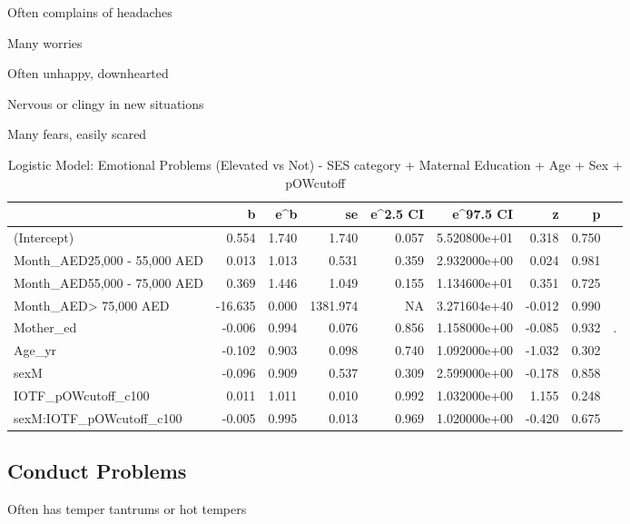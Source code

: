 \documentclass[
]{article}
\begin{document}
Often complains of headaches

Many worries

Often unhappy, downhearted

Nervous or clingy in new situations

Many fears, easily scared

\FloatBarrier

\begin{table}[!h]

\caption{\label{tab:IOTF_pOWcutoff_emotprobs_elevated_logit}Logistic Model: Emotional Problems (Elevated vs Not) - SES category + Maternal Education + Age + Sex + pOWcutoff}
\centering
\begin{tabular}[t]{lrrrrrrrl}
\toprule
  & b & e\textasciicircum{}b & se & e\textasciicircum{}2.5 CI & e\textasciicircum{}97.5 CI & z & p &  \\
\midrule
(Intercept) & 0.554 & 1.740 & 1.740 & 0.057 & 5.520800e+01 & 0.318 & 0.750 & \\
Month\_AED25,000 - 55,000 AED & 0.013 & 1.013 & 0.531 & 0.359 & 2.932000e+00 & 0.024 & 0.981 & \\
Month\_AED55,000 - 75,000 AED & 0.369 & 1.446 & 1.049 & 0.155 & 1.134600e+01 & 0.351 & 0.725 & \\
Month\_AED> 75,000 AED & -16.635 & 0.000 & 1381.974 & NA & 3.271604e+40 & -0.012 & 0.990 & \\
Mother\_ed & -0.006 & 0.994 & 0.076 & 0.856 & 1.158000e+00 & -0.085 & 0.932 & .\\
\addlinespace
Age\_yr & -0.102 & 0.903 & 0.098 & 0.740 & 1.092000e+00 & -1.032 & 0.302 & \\
sexM & -0.096 & 0.909 & 0.537 & 0.309 & 2.599000e+00 & -0.178 & 0.858 & \\
IOTF\_pOWcutoff\_c100 & 0.011 & 1.011 & 0.010 & 0.992 & 1.032000e+00 & 1.155 & 0.248 & \\
sexM:IOTF\_pOWcutoff\_c100 & -0.005 & 0.995 & 0.013 & 0.969 & 1.020000e+00 & -0.420 & 0.675 & \\
\bottomrule
\end{tabular}
\end{table}

\FloatBarrier

\hypertarget{conduct-problems}{%
\subsection{Conduct Problems}\label{conduct-problems}}

Often has temper tantrums or hot tempers
\end{document}

